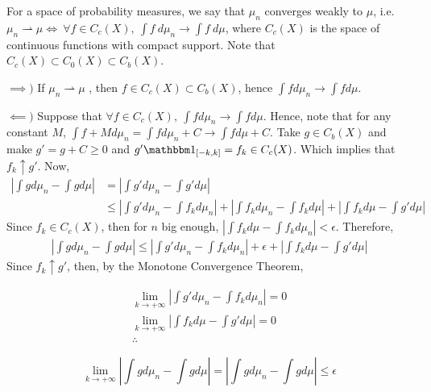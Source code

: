 \begin{lemma}
  For a space of probability measures, we say that $\mu_n$ converges weakly to $\mu$, i.e.
  $\mu_n \rightharpoonup \mu \iff \ \forall f \in C_c(X), \ \int f \ d\mu_n \to \int f \ d\mu$, where
  $C_c(X)$ is the space of continuous functions with compact support. Note that
  $C_c(X) \subset C_0(X) \subset C_b(X)$.
  \label{lem:weakconvergenceCc}
\end{lemma}
\begin{prf}

  $\implies)$ If $\mu_n \rightharpoonup \mu$	, then $f \in C_c(X)\subset C_b(X)$, hence $\int f d\mu_n \to \int f d\mu$.

  \vspace{5mm}
  $\impliedby)$ Suppose that $\forall f \in C_c(X),\ \int f d\mu_n \to \int f d\mu$. Hence, note that for
  any constant $M$, $\int f + M d\mu_n = \int f d\mu_n + C \to \int f d\mu + C$.
  Take $g \in C_b(X)$ and make $g' = g + C \geq 0$ and
  $g' \mathbbm 1_{[-k,k]} = f_k \in  C_c(X)$. Which implies that $f_k \uparrow g'$.
  Now,
  \begin{align*}
    \left|\int g d\mu_n - \int g d\mu \right| & =
    \left|\int g' d\mu_n - \int g' d\mu \right|      \\
                                              & \leq
    \left|\int g' d\mu_n - \int f_k d\mu_n \right| +
    \left|\int f_k d\mu_n - \int f_k d\mu \right| +
    \left|\int f_k d\mu - \int g' d\mu \right|
  \end{align*}
  Since $f_k \in C_c(X)$, then for $n$ big enough,
  $\left|\int f_k d\mu - \int f_k d\mu_n \right|< \epsilon$. Therefore,
  \begin{align*}
    \left|\int g d\mu_n - \int g d\mu \right| \leq
    \left|\int g' d\mu_n - \int f_k d\mu_n \right| +
    \epsilon +
    \left|\int f_k d\mu - \int g' d\mu \right|
  \end{align*}
  Since $f_k \uparrow g'$, then,
  by the Monotone Convergence Theorem,

  \begin{gather*}
    \lim_{k\to +\infty}
    \left|\int g' d\mu_n - \int f_k d\mu_n \right| = 0 \\
    \lim_{k\to +\infty}
    \left|\int f_k d\mu - \int g' d\mu \right| = 0 \\
    \therefore
  \end{gather*}

  \begin{equation*}
    \lim_{k\to +\infty}\left|\int g d\mu_n - \int g d\mu \right| =
    \left|\int g d\mu_n - \int g d\mu \right| \leq
    \epsilon
  \end{equation*}
\end{prf}

